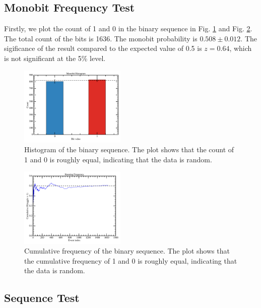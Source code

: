 \subsection{Monobit Frequency Test}
Firstly, we plot the count of 1 and 0 in the binary sequence in Fig. \ref{fig:monobit_histogram} and Fig. \ref{fig:running_frequency}. The total count of the bits is 1636. The monobit probability is $0.508 \pm 0.012$. The sigificance of the result compared to the expected value of 0.5 is $z=0.64$, which is not significant at the 5\% level. 
\begin{figure}
\centering
\includegraphics[width=0.45\textwidth]{figure/monobit_histogram.png}
\caption{Histogram of the binary sequence. The plot shows that the count of 1 and 0 is roughly equal, indicating that the data is random.}
\label{fig:monobit_histogram}
\end{figure}
\begin{figure}
\centering
\includegraphics[width=0.45\textwidth]{figure/running_frequency.png}
\caption{Cumulative frequency of the binary sequence. The plot shows that the cumulative frequency of 1 and 0 is roughly equal, indicating that the data is random.}
\label{fig:running_frequency}

\end{figure}

\subsection{Sequence Test}

